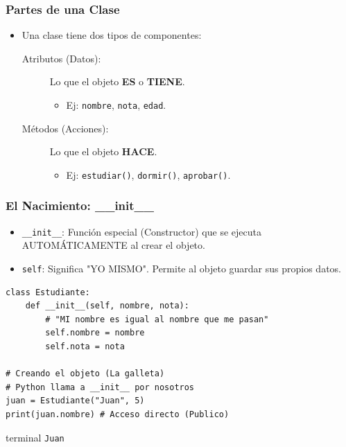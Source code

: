 \documentclass[11pt]{beamer}
\newcommand{\terminal}[1]{
    \vspace{-0.2em}
    \begin{beamercolorbox}[wd=\linewidth, sep=0.3em, rounded=false, shadow=false]{terminal}
    \texttt{#1}
    \end{beamercolorbox}
    \vspace{0.2em}
}
\begin{document}
\begin{frame}[fragile]\frametitle{Partes de una Clase}
\begin{itemize}
\item Una clase tiene dos tipos de componentes:
\begin{description}
\item[Atributos (Datos):] Lo que el objeto \textbf{ES} o \textbf{TIENE}.
    \begin{itemize}
    \item Ej: \lstinline|nombre|, \lstinline|nota|, \lstinline|edad|.
    \end{itemize}
\item[Métodos (Acciones):] Lo que el objeto \textbf{HACE}.
    \begin{itemize}
    \item Ej: \lstinline|estudiar()|, \lstinline|dormir()|, \lstinline|aprobar()|.
    \end{itemize}
\end{description}
\end{itemize}
\end{frame}

\begin{frame}[fragile]\frametitle{El Nacimiento: \_\_init\_\_}
\begin{itemize}
    \item \lstinline|__init__|: Función especial (Constructor) que se ejecuta AUTOMÁTICAMENTE al crear el objeto.
    \item \lstinline|self|: Significa "YO MISMO". Permite al objeto guardar sus propios datos.
\end{itemize}
\begin{lstlisting}[basicstyle=\scriptsize]
class Estudiante:
    def __init__(self, nombre, nota):
        # "MI nombre es igual al nombre que me pasan"
        self.nombre = nombre
        self.nota = nota

# Creando el objeto (La galleta)
# Python llama a __init__ por nosotros
juan = Estudiante("Juan", 5) 
print(juan.nombre) # Acceso directo (Publico)
\end{lstlisting}
\terminal{Juan}
\end{frame}
\end{document}
